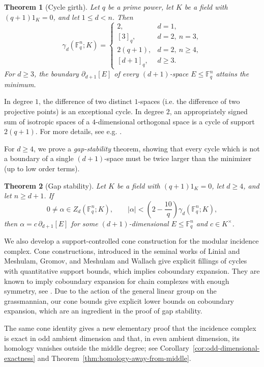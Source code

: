 \documentclass[11pt]{article}
\numberwithin{equation}{section}
\newtheorem{theorem}{Theorem}[section]
\newcommand{\F}{\mathbb F}
\begin{document}
\begin{theorem}[Cycle girth]\label{thm:minimum-support}
Let $q$ be a prime power, let $K$ be a field with $(q+1)1_K=0$, and let $1\le d<n$. Then
\[
\gamma_d(\F_q^n;K)
=
\begin{cases}
2, & d=1,\\
[3]_q, & d=2,\ n=3,\\
2(q+1), & d=2,\ n\ge4,\\
[d+1]_q, & d\ge3.
\end{cases}
\]
For $d\ge3$, the boundary $\partial_{d+1}[E]$ of every $(d+1)$-space $E\le\F_q^n$ attains the minimum.
\end{theorem}

In degree $1$, the difference of two distinct $1$-spaces (i.e. the difference of two projective points) is an exceptional cycle. In degree $2$, an appropriately signed sum of isotropic spaces of a $4$-dimensional orthogonal space is a cycle of support $2(q+1)$. For more details, see e.g. \cite{James1984}.

For $d\ge4$, we prove a \emph{gap-stability} theorem, showing that every cycle which is not a boundary of a single $(d+1)$-space must be twice larger than the minimizer (up to low order terms).

\begin{theorem}[Gap stability]\label{thm:gap-stability}
Let $K$ be a field with $(q+1)1_K=0$, let $d\ge4$, and let
$n\ge d+1$. If
\[
0\ne\alpha\in Z_d(\F_q^n;K),
\qquad
|\alpha|<
\left(2-\frac{10}{q}\right)
\gamma_d(\F_q^n;K),
\]
then $\alpha=c\,\partial_{d+1}[E]$ for some $(d+1)$-dimensional
$E\le\F_q^n$ and $c\in K^\times$.
\end{theorem}

We also develop a support-controlled cone construction for the modular incidence complex. Cone constructions, introduced in the seminal works of Linial and Meshulam, Gromov, and Meshulam and Wallach \cite{LinialMeshulam2006,MeshulamWallach2009,Gromov2010} give explicit fillings of cycles with quantitative support bounds, which implies coboundary expansion. They are known to imply coboundary expansion for chain complexes with enough symmetry, see \cite{LubotzkyMeshulamMozes2016}. Due to the action of the general linear group on the grassmannian, our cone bounds give explicit lower bounds on coboundary expansion, which are an ingredient in the proof of gap stability.

The same cone identity gives a new elementary proof that the incidence complex is exact in odd ambient dimension and that, in even ambient dimension, its homology vanishes outside the middle degree; see Corollary~\ref{cor:odd-dimensional-exactness} and Theorem~\ref{thm:homology-away-from-middle}.
\end{document}
